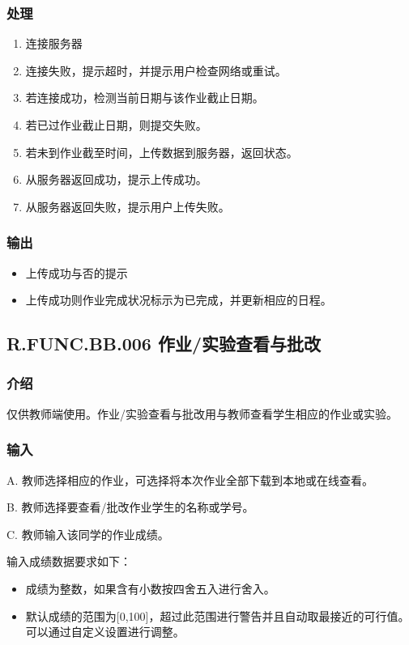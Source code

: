       \subsubsection{处理}
      \begin{enumerate}
        \item 连接服务器
        \item 连接失败，提示超时，并提示用户检查网络或重试。
        \item 若连接成功，检测当前日期与该作业截止日期。
        \item 若已过作业截止日期，则提交失败。
        \item 若未到作业截至时间，上传数据到服务器，返回状态。
        \item 从服务器返回成功，提示上传成功。
        \item 从服务器返回失败，提示用户上传失败。
      \end{enumerate}
      \subsubsection{输出}
      \begin{itemize}
        \item 上传成功与否的提示
        \item 上传成功则作业完成状况标示为已完成，并更新相应的日程。
      \end{itemize}

    \subsection{R.FUNC.BB.006 作业/实验查看与批改}
      \subsubsection{介绍}
      仅供教师端使用。作业/实验查看与批改用与教师查看学生相应的作业或实验。
      \subsubsection{输入}
A. 教师选择相应的作业，可选择将本次作业全部下载到本地或在线查看。

B. 教师选择要查看/批改作业学生的名称或学号。

C. 教师输入该同学的作业成绩。

输入成绩数据要求如下：
  \begin{itemize}
   \item 成绩为整数，如果含有小数按四舍五入进行舍入。
   \item 默认成绩的范围为[0,100]，超过此范围进行警告并且自动取最接近的可行值。可以通过自定义设置进行调整。
 \end{itemize}
